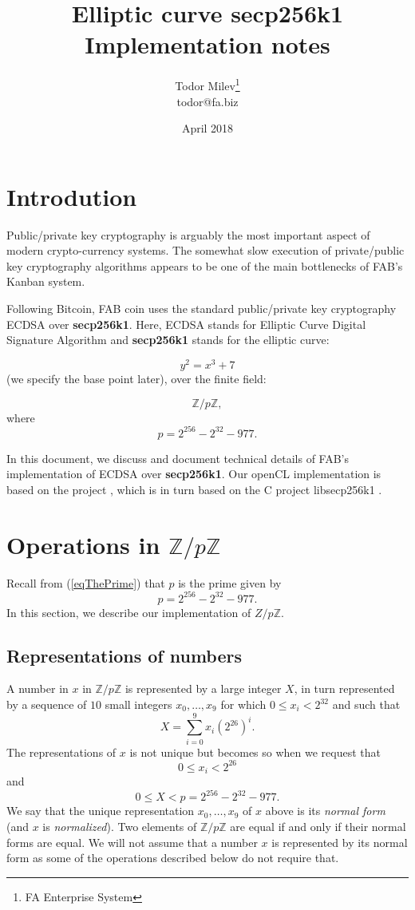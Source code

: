 \documentclass{article}
\date{April 2018}
\title{Elliptic curve secp256k1 \\ Implementation notes}
\author{Todor Milev\footnote{FA Enterprise System}\\ todor@fa.biz}
\newcommand{\secpTwoFiveSixKone}{{\bf secp256k1}}
\begin{document}
\maketitle
\section{Introdution}
Public/private key cryptography is arguably the most important aspect of modern crypto-currency systems. The somewhat slow execution of private/public key cryptography algorithms appears to be one of the main bottlenecks of FAB's Kanban system. 


Following Bitcoin, FAB coin uses the standard public/private key cryptography ECDSA over \secpTwoFiveSixKone. Here, ECDSA stands for Elliptic Curve Digital Signature Algorithm and \secpTwoFiveSixKone{} stands for the elliptic curve:

\[
y^2 = x^3 + 7
\]
(we specify the base point later), over the finite field:

\[
\mathbb Z / p\mathbb Z, 
\]
where
\begin{equation}\label{eqThePrime}
p= 2^{256} - 2^{32} - 977.
\end{equation}

In this document, we discuss and document technical details of FAB's implementation of ECDSA over  \secpTwoFiveSixKone{}. Our openCL implementation is based on the project \cite{secp256k1:openCLimplementationHanh0}, which is in turn based on the C project libsecp256k1 \cite{Wuille:secp256k1}.

\section{Operations in $\mathbb Z / p\mathbb Z$}
Recall from (\ref{eqThePrime}) that $p$ is the prime given by
\[
p= 2^{256} - 2^{32} - 977.
\]
In this section, we describe our implementation of $Z / p\mathbb Z$.
\subsection{Representations of numbers}
A number in $x$ in $\mathbb Z / p\mathbb Z$ is represented by a large integer $X$, in turn represented by a sequence of $10$ small integers $x_0,\dots, x_9$ for which $0 \leq x_i < 2^{32}$ and such that
\[
X = \sum_{i=0}^{9} x_i \left(2^{26}\right)^i.
\]
The representations of $x$ is not unique but becomes so when we request that 
\[
0\leq x_i < 2^{26}
\]
and 
\[
0 \leq X < p = 2^{256} - 2^{32} - 977.
\]
We say that the unique representation $x_0, \dots, x_9$ of $x$ above is its \emph{normal form} (and $x$ is \emph{normalized}). Two elements of $ \mathbb Z / p \mathbb Z$ are equal if and only if their normal forms are equal. We will not assume that a number $x$ is represented by its normal form as some of the operations described below do not require that.
\end{document}
